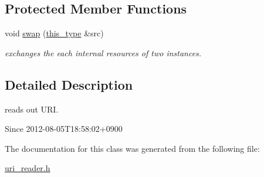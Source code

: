 \subsection*{Protected Member Functions}
\begin{DoxyCompactItemize}
\item 
\hypertarget{classhryky_1_1uri_1_1_reader_ad473f0d098ec8ef25ad997c3f6bb6329}{void \hyperlink{classhryky_1_1uri_1_1_reader_ad473f0d098ec8ef25ad997c3f6bb6329}{swap} (\hyperlink{classhryky_1_1uri_1_1_reader_aba573908840f955a5cdb7b9d205474c8}{this\-\_\-type} \&src)}\label{classhryky_1_1uri_1_1_reader_ad473f0d098ec8ef25ad997c3f6bb6329}

\begin{DoxyCompactList}\small\item\em exchanges the each internal resources of two instances. \end{DoxyCompactList}\end{DoxyCompactItemize}


\subsection{Detailed Description}
reads out U\-R\-I. 

\begin{DoxySince}{Since}
2012-\/08-\/05\-T18\-:58\-:02+0900 
\end{DoxySince}


The documentation for this class was generated from the following file\-:\begin{DoxyCompactItemize}
\item 
\hyperlink{uri__reader_8h}{uri\-\_\-reader.\-h}\end{DoxyCompactItemize}
